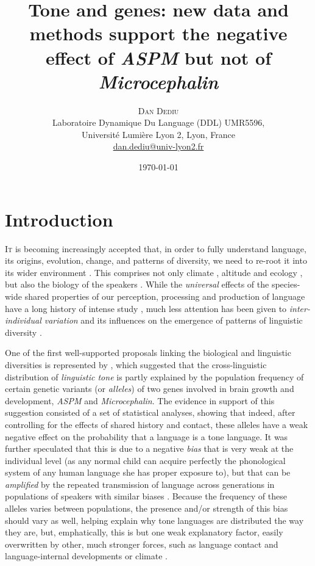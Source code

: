 \documentclass[twoside,twocolumn]{article}
\title{Tone and genes: new data and methods support the negative effect of \textit{ASPM} but not of \textit{Microcephalin}} %
\author{%
\textsc{Dan Dediu} \\[1ex] %
\normalsize Laboratoire Dynamique Du Language (DDL) UMR5596,\\
\normalsize Université Lumière Lyon 2, Lyon, France \\ %
\normalsize \href{mailto:dan.dediu@univ-lyon2.fr}{dan.dediu@univ-lyon2.fr} %
}
\date{\today} %
\begin{document}
\maketitle


\section{Introduction}

\lettrine[nindent=0em,lines=2]{I} t is becoming increasingly accepted that, in order to fully understand language, its origins, evolution, change, and patterns of diversity, we need to re-root it into its wider environment \citep{dediu_language_2017,blasi_human_2019,everett_language_2016}.
This comprises not only climate \citep{everett_language_2016}, altitude \citep{everett_evidence_2013} and ecology \citep{bentz_evolution_2018}, but also the biology of the speakers \citep{dediu_language_2017}.
While the \emph{universal} effects of the species-wide shared properties of our perception, processing and production of language have a long history of intense study \citet{christiansen_language_2008,ohala_sound_1989,yu_origins_2013}, much less attention has been given to \emph{inter-individual variation} and its influences on the emergence of patterns of linguistic diversity \citep{dediu_language_2017}.

One of the first well-supported proposals linking the biological and linguistic diversities is represented by \citet{dediu_ladd_2007}, which suggested that the cross-linguistic distribution of \emph{linguistic tone} is partly explained by the population frequency of certain genetic variants (or \emph{alleles}) of two genes involved in brain growth and development, \textit{ASPM} and \textit{Microcephalin}.
The evidence in support of this suggestion consisted of a set of statistical analyses, showing that indeed, after controlling for the effects of shared history and contact, these alleles have a weak negative effect on the probability that a language is a tone language.
It was further speculated that this is due to a negative \emph{bias} that is very weak at the individual level (as any normal child can acquire perfectly the phonological system of any human language she has proper exposure to), but that can be \emph{amplified} by the repeated transmission of language across generations in populations of speakers with similar biases \citet{dediu_ladd_2007,ladd_bioling_2008,dediu_humbiol_2011}.
Because the frequency of these alleles varies between populations, the presence and/or strength of this bias should vary as well, helping explain why tone languages are distributed the way they are, but, emphatically, this is but one weak explanatory factor, easily overwritten by other, much stronger forces, such as language contact and language-internal developments \citep{hombert_tone_1979,yip_tone_2002,hombert_towards_1975} or climate \citep{everett_language_2016}.
\end{document}
